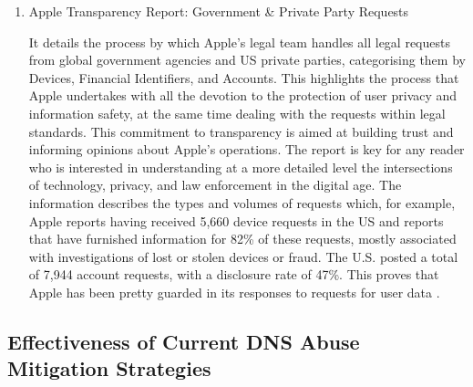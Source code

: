 \begin{enumerate}
 \item Apple Transparency Report: Government \& Private Party Requests 

It details the process by which Apple's legal team handles all legal requests from global government agencies and US private parties, categorising them by Devices, Financial Identifiers, and Accounts. This highlights the process that Apple undertakes with all the devotion to the protection of user privacy and information safety, at the same time dealing with the requests within legal standards. This commitment to transparency is aimed at building trust and informing opinions about Apple's operations. The report is key for any reader who is interested in understanding at a more detailed level the intersections of technology, privacy, and law enforcement in the digital age. The information describes the types and volumes of requests which, for example, Apple reports having received 5,660 device requests in the US and reports that have furnished information for 82\% of these requests, mostly associated with investigations of lost or stolen devices or fraud. The U.S. posted a total of 7,944 account requests, with a disclosure rate of 47\%. This proves that Apple has been pretty guarded in its responses to requests for user data \cite{AppleTransparencyReportGB}.


\end{enumerate}

\subsection{Effectiveness of Current DNS Abuse Mitigation Strategies}


